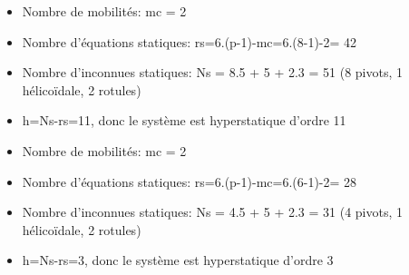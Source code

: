 
\begin{itemize}
 \item Nombre de mobilités: mc = 2
 \item Nombre d'équations statiques: rs=6.(p-1)-mc=6.(8-1)-2= 42
 \item Nombre d'inconnues statiques: Ns = 8.5 + 5 + 2.3 = 51 (8 pivots, 1 hélicoïdale, 2 rotules)
 \item h=Ns-rs=11, donc le système est hyperstatique d'ordre 11
\end{itemize}


\begin{itemize}
 \item Nombre de mobilités: mc = 2
 \item Nombre d'équations statiques: rs=6.(p-1)-mc=6.(6-1)-2= 28
 \item Nombre d'inconnues statiques: Ns = 4.5 + 5 + 2.3 = 31 (4 pivots, 1 hélicoïdale, 2 rotules)
 \item h=Ns-rs=3, donc le système est hyperstatique d'ordre 3
\end{itemize}

